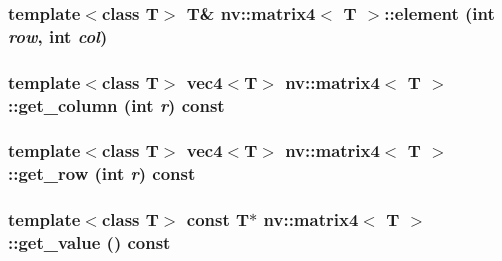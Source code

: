 \hypertarget{classnv_1_1matrix4_82c7f1a1c17765f07c2fba4f2f231dd3}{
\subsubsection[{element}]{\setlength{\rightskip}{0pt plus 5cm}template$<$class T$>$ T\& {\bf nv::matrix4}$<$ T $>$::element (int {\em row}, \/  int {\em col})}}
\label{classnv_1_1matrix4_82c7f1a1c17765f07c2fba4f2f231dd3}


\hypertarget{classnv_1_1matrix4_994cf662df66cef73f1b53ac6b522c35}{
\subsubsection[{get\_\-column}]{\setlength{\rightskip}{0pt plus 5cm}template$<$class T$>$ {\bf vec4}$<$T$>$ {\bf nv::matrix4}$<$ T $>$::get\_\-column (int {\em r}) const}}
\label{classnv_1_1matrix4_994cf662df66cef73f1b53ac6b522c35}


\hypertarget{classnv_1_1matrix4_8570ef93f472de8b22871dc0eeae063f}{
\subsubsection[{get\_\-row}]{\setlength{\rightskip}{0pt plus 5cm}template$<$class T$>$ {\bf vec4}$<$T$>$ {\bf nv::matrix4}$<$ T $>$::get\_\-row (int {\em r}) const}}
\label{classnv_1_1matrix4_8570ef93f472de8b22871dc0eeae063f}


\hypertarget{classnv_1_1matrix4_513224050dd280c216165b244e2a0a45}{
\subsubsection[{get\_\-value}]{\setlength{\rightskip}{0pt plus 5cm}template$<$class T$>$ const T$\ast$ {\bf nv::matrix4}$<$ T $>$::get\_\-value () const}}
\label{classnv_1_1matrix4_513224050dd280c216165b244e2a0a45}


